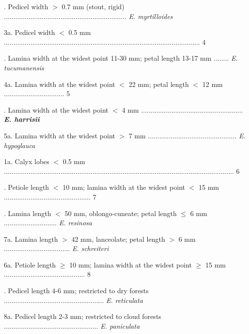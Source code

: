 \documentclass[fleqn,10pt,lineno]{wlpeerj} %
\begin{document}
\indent{}. Pedicel width $>$ 0.7 mm (stout, rigid) ................................................................. \emph{E. myrtilloides}

\indent\indent 3a. Pedicel width $<$ 0.5 mm ........................................................................................................ 4

\indent\indent{}. Lamina width at the widest point 11-30 mm; petal length 13-17 mm ........ \emph{E. tucumanensis}

\indent\indent\indent 4a. Lamina width at the widest point $<$ 22 mm; petal length $<$ 12 mm ................................ 5

\indent\indent\indent{}. Lamina width at the widest point $<$ 4 mm ...................................................... \emph{\textbf{E. harrisii}}


\indent\indent\indent\indent 5a. Lamina width at the widest point $>$ 7 mm ............................................... \emph{E. hypoglauca}

\noindent 1a. Calyx lobes $<$ 0.5 mm .......................................................................................................................... 6

. Petiole length $<$ 10 mm; lamina width at the widest point $<$ 15 mm .............................................. 7

\indent{}. Lamina length $<$ 50 mm, oblongo-cuneate; petal length $\leq$ 6 mm ............................ \emph{E. resinosa}

\indent\indent 7a. Lamina length $>$ 42 mm, lanceolate; petal length $>$ 6 mm ................................... \emph{E. schreiteri}

\indent 6a. Petiole length $\geq$ 10 mm; lamina width at the widest point $\geq$ 15 mm ........................................... 8

\indent{}. Pedicel length 4-6 mm; restricted to dry forests  ..................................................... \emph{E. reticulata}

\indent\indent 8a. Pedicel length 2-3 mm; restricted to cloud forests  .................................................. \emph{E. paniculata}
\end{document}
